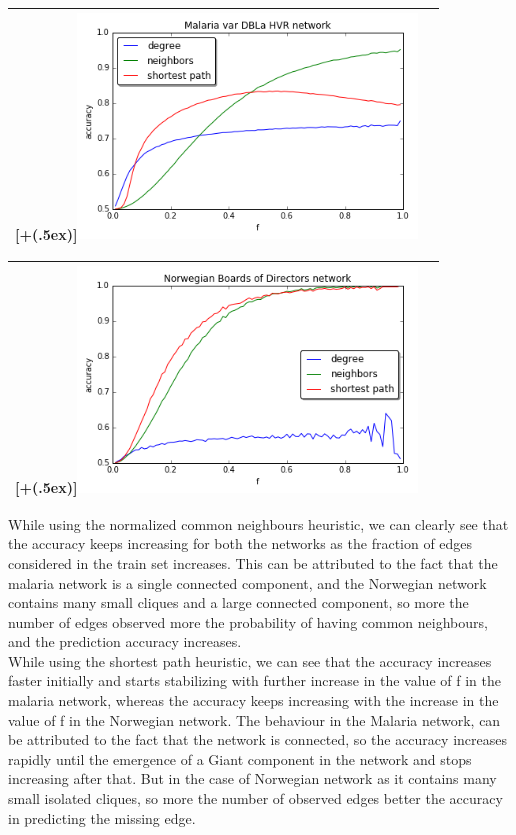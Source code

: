 \documentclass{article}
\newcommand*{\addheight}[2][.5ex]{%
  \raisebox{0pt}[\dimexpr\height+(#1)\relax]{#2}%
}
\begin{document}
\begin{enumerate}[label=(\alph*)]
\begin{table}[H]
\centering
\begin{tabular}{|c|c|}
	\hline
	\addheight{\includegraphics[width=90mm]{images/1b_HVR.png}} \\
	\hline
\end{tabular}
\end{table}
\begin{table}[H]
\centering
\begin{tabular}{|c|c|}
	\hline
	\addheight{\includegraphics[width=90mm]{images/1b_net1m.png}} \\
	\hline
\end{tabular}
\end{table}

While using the normalized common neighbours heuristic, we can clearly see that the accuracy keeps increasing for both the networks as the fraction of edges considered in the train set increases. This can be attributed to the fact that the malaria network is a single connected component, and the Norwegian network contains many small cliques and a large connected component, so more the number of edges observed more the probability of having common neighbours, and the prediction accuracy increases.\\

While using the shortest path heuristic, we can see that the accuracy increases faster initially and starts stabilizing with further increase in the value of f in the malaria network, whereas the accuracy keeps increasing with the increase in the value of f in the Norwegian network. The behaviour in the Malaria network, can be attributed to the fact that the network is connected, so the accuracy increases rapidly until the emergence of a Giant component in the network and stops increasing after that. But in the case of Norwegian network as it contains many small isolated cliques, so more the number of observed edges better the accuracy in predicting the missing edge.\\


\end{enumerate}
\end{document}
